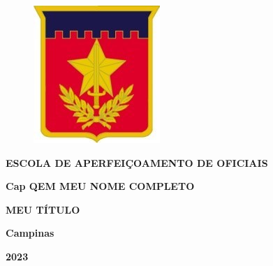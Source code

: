 \documentclass[12pt,a4paper]{article}
\def\mytitle{MEU TÍTULO}
\def\myname{Cap QEM MEU NOME COMPLETO}
\begin{document}
\begin{titlepage}
    \centering
    \begin{figure}
        \centering
        \includegraphics{imagens/ESAO.jpg}
        \label{fig:enter-label}
    \end{figure}
    \onehalfspacing
    \textbf{\Large ESCOLA DE APERFEIÇOAMENTO DE OFICIAIS} %

    \vspace{2\baselineskip} %

    \textbf{\myname} %

    \vspace{7\baselineskip} %

    \textbf{\mytitle} %

    \vspace{2\baselineskip} %


    \vspace{\baselineskip} %


    \vfill %

    \vspace{5cm} %

    \textbf{Campinas} %

    \vspace{\baselineskip} %

    \textbf{2023} %
\end{titlepage}

\end{document}
